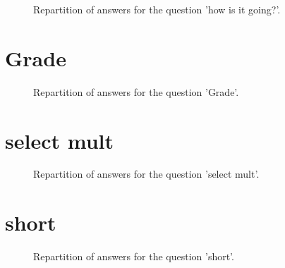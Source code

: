 \documentclass[12pt]{article}
\begin{document}
\label{sec:23}


\begin{figure}[h!]
    \caption{\label{figure:q23-1}Repartition of answers for the question 'how is it going?'.}
\end{figure}



\clearpage{}
\section{Grade}

\label{sec:29}


\begin{figure}[h!]
    \caption{\label{figure:q29-1}Repartition of answers for the question 'Grade'.}
\end{figure}



\clearpage{}
\section{select mult}

\label{sec:18}


\begin{figure}[h!]
    \caption{\label{figure:q18-1}Repartition of answers for the question 'select mult'.}
\end{figure}



\clearpage{}
\section{short}

\label{sec:15}


\begin{figure}[h!]
    \caption{\label{figure:q15-1}Repartition of answers for the question 'short'.}
\end{figure}
\end{document}
